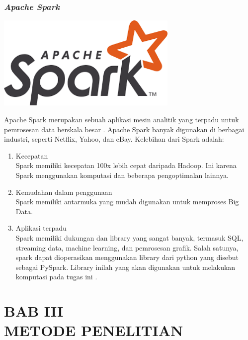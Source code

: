 \documentclass[12pt,a4paper]{report}
\begin{document}
	\subsection{\textit{Apache Spark}}
	\begin{center}
		\includegraphics[width=8.7cm]{gambar/spark.png}
	\end{center}
	Apache Spark merupakan sebuah aplikasi mesin analitik yang terpadu untuk pemrosesan data berskala besar \cite{Apache2018}. Apache Spark banyak digunakan di berbagai industri, seperti Netflix, Yahoo, dan eBay. Kelebihan dari Spark adalah:
	\begin{enumerate}
		\item Kecepatan\\
		Spark memiliki kecepatan 100x lebih cepat daripada Hadoop. Ini karena Spark menggunakan komputasi dan beberapa pengoptimalan lainnya. 
		\item Kemudahan dalam penggunaan\\
		Spark memiliki antarmuka yang mudah digunakan untuk memproses Big Data.
		\item Aplikasi terpadu\\
		Spark memiliki dukungan dan library yang sangat banyak, termasuk SQL, streaming data, machine learning, dan pemrosesan grafik. Salah satunya, spark dapat dioperasikan menggunakan library dari python yang disebut sebagai PySpark. Library inilah yang akan digunakan untuk melakukan komputasi pada tugas ini \cite{Databricks}. 
	\end{enumerate}

\chapter*{BAB III \\ METODE PENELITIAN}
\setcounter{chapter}{3}
\setcounter{section}{0}
\setcounter{figure}{0}
\setcounter{equation}{0}
\thispagestyle{myplain}
\end{document}
